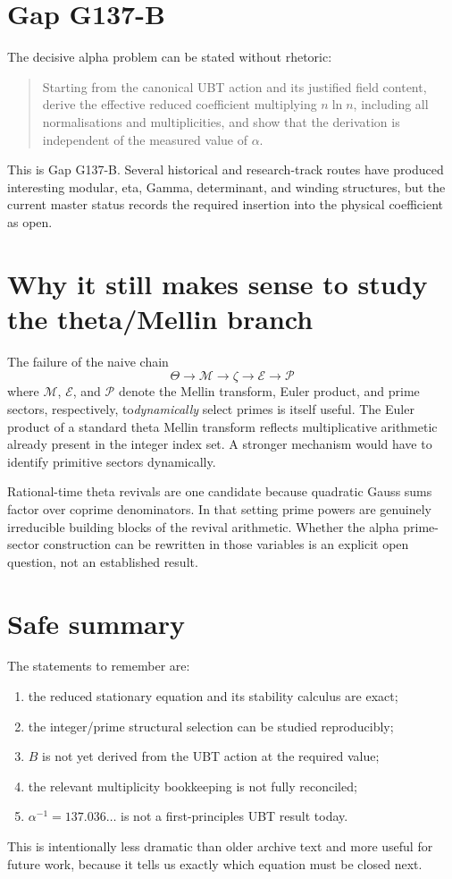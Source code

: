 \section{Gap G137-B}
The decisive alpha problem can be stated without rhetoric:
\begin{quote}
Starting from the canonical UBT action and its justified field content, derive
the effective reduced coefficient multiplying $n\ln n$, including all
normalisations and multiplicities, and show that the derivation is independent
of the measured value of $\alpha$.
\end{quote}
This is Gap G137-B.  Several historical and research-track routes have produced
interesting modular, eta, Gamma, determinant, and winding structures, but the
current master status records the required insertion into the physical
coefficient as open.

\section{Why it still makes sense to study the theta/Mellin branch}
The failure of the naive chain
\[
 \Theta\to\mathcal M\to\zeta\to\mathcal E\to\mathcal P
\]
where $\mathcal M$, $\mathcal E$, and $\mathcal P$ denote the Mellin transform,
Euler product, and prime sectors, respectively,
to\emph{dynamically} select primes is itself useful.  The Euler product of a
standard theta Mellin transform reflects multiplicative arithmetic already
present in the integer index set.  A stronger mechanism would have to identify
primitive sectors dynamically.

Rational-time theta revivals are one candidate because quadratic Gauss sums
factor over coprime denominators.  In that setting prime powers are genuinely
irreducible building blocks of the revival arithmetic.  Whether the alpha
prime-sector construction can be rewritten in those variables is an explicit
open question, not an established result.

\section{Safe summary}
The statements to remember are:
\begin{enumerate}
 \item the reduced stationary equation and its stability calculus are exact;
 \item the integer/prime structural selection can be studied reproducibly;
 \item $B$ is not yet derived from the UBT action at the required value;
 \item the relevant multiplicity bookkeeping is not fully reconciled;
 \item $\alpha^{-1}=137.036\ldots$ is not a first-principles UBT result today.
\end{enumerate}
This is intentionally less dramatic than older archive text and more useful for
future work, because it tells us exactly which equation must be closed next.
